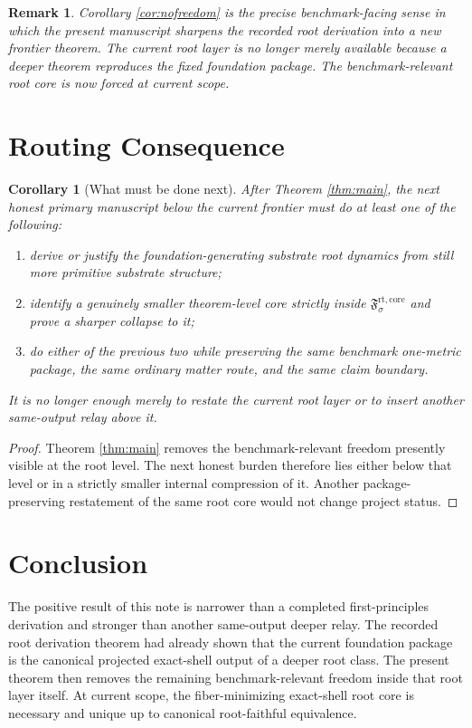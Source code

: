 \documentclass[11pt]{article}
\newcommand{\RootCore}[1]{\mathfrak F_{#1}^{\mathrm{rt,core}}}
\newtheorem{remark}{Remark}
\newtheorem{corollary}{Corollary}
\begin{document}
\begin{remark}
Corollary \ref{cor:nofreedom} is the precise benchmark-facing sense in which the present manuscript sharpens the recorded root derivation into a new frontier theorem. The current root layer is no longer merely available because a deeper theorem reproduces the fixed foundation package. The benchmark-relevant root core is now forced at current scope.
\end{remark}

\section{Routing Consequence}

\begin{corollary}[What must be done next]
\label{cor:next}
After Theorem \ref{thm:main}, the next honest primary manuscript below the current frontier must do at least one of the following:
\begin{enumerate}
    \item derive or justify the foundation-generating substrate root dynamics from still more primitive substrate structure;
    \item identify a genuinely smaller theorem-level core strictly inside \(\RootCore{\sigma}\) and prove a sharper collapse to it;
    \item do either of the previous two while preserving the same benchmark one-metric package, the same ordinary matter route, and the same claim boundary.
\end{enumerate}
It is no longer enough merely to restate the current root layer or to insert another same-output relay above it.
\end{corollary}

\begin{proof}
Theorem \ref{thm:main} removes the benchmark-relevant freedom presently visible at the root level. The next honest burden therefore lies either below that level or in a strictly smaller internal compression of it. Another package-preserving restatement of the same root core would not change project status.
\end{proof}

\section{Conclusion}

The positive result of this note is narrower than a completed first-principles derivation and stronger than another same-output deeper relay. The recorded root derivation theorem had already shown that the current foundation package is the canonical projected exact-shell output of a deeper root class. The present theorem then removes the remaining benchmark-relevant freedom inside that root layer itself. At current scope, the fiber-minimizing exact-shell root core is necessary and unique up to canonical root-faithful equivalence.
\end{document}
